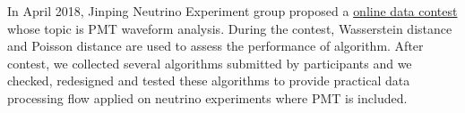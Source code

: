 \acknowledgments
In April 2018, Jinping Neutrino Experiment group proposed a \href{https://mp.weixin.qq.com/s?__biz=MzA4MTAwMzgzOA==&mid=2650872289&idx=2&sn=48145a6598545d201f940e0459de99dd&chksm=846e2db0b319a4a627e902d0d6ed4b9d968225566021342c5935764963f352fbe02db1bdb333&mpshare=1&scene=1&srcid=0307c4HOvK0ChJUcq9blC3ub%23rd}{online data contest} whose topic is PMT waveform analysis. During the contest, Wasserstein distance and Poisson distance are used to assess the performance of algorithm. After contest, we collected several algorithms submitted by participants and we checked, redesigned and tested these algorithms to provide practical data processing flow applied on neutrino experiments where PMT is included. 
